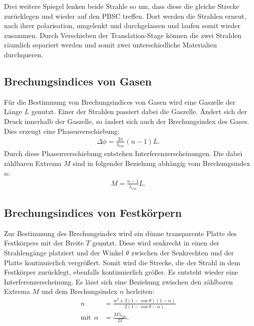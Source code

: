 Drei weitere Spiegel lenken beide Strahle so um, dass diese die gleiche Strecke zurücklegen und wieder auf
den PBSC treffen. Dort werden die Strahlen erneut, nach ihrer polarisation,
umgelenkt und durchgelassen und laufen somit wieder zusammen.
Durch Verschieben der Translation-Stage können die zwei Strahlen räumlich separiert
werden und somit zwei unterschiedliche Materialien durchqueren.
\FloatBarrier

\subsection{Brechungsindices von Gasen}
Für die Bestimmung von Brechungsindices von Gasen wird eine Gaszelle
der Länge $L$ genutzt. Einer der Strahlen passiert dabei die Gaszelle.
Ändert sich der Druck innerhalb der Gaszelle, so ändert sich auch
der Brechungsindex des Gases. Dies erzeugt eine Phasenverschiebung:
\begin{align}
  \Delta\phi=\frac{2\pi}{\lambda_\mathrm{vac}}(n-1)L.
\end{align}
Durch diese Phasenverschiebung entstehen Interferenzerscheinungen.
Die dabei zählbaren Extrema $M$ sind in folgender Beziehung abhängig
vom Brechungsindex $n$:
\begin{align}
  M=\frac{n-1}{\lambda_\mathrm{vac}}L\label{eqn:gas}.
\end{align}

\subsection{Brechungsindices von Festkörpern}
Zur Bestimmung des Brechungsindex wird ein dünne transparente
Platte des Festkörpers mit der Breite $T$ genutzt. Diese wird senkrecht in einen der Strahlengänge
platziert und der Winkel $\theta$ zwischen der Senkrechten und der Platte kontinuierlich vergrößert. Somit wird die
Strecke, die der Strahl in dem Festkörper zurücklegt, ebenfalls kontinuierlich größer.
Es entsteht wieder eine Interferenzerscheinung.
Es lässt sich eine Beziehung zwischen den zählbaren Extrema $M$
und dem Brechungsindex $n$ herleiten:
\begin{align}%
  n&=\frac{\alpha^2+2(1-\cos\theta)(1-\alpha)}{2(1-\cos\theta-\alpha)}\\
  \text{mit} \ \ \alpha&= \frac{M\lambda_\mathrm{vac}}{2T}. \label{eqn:glas}
\end{align}

